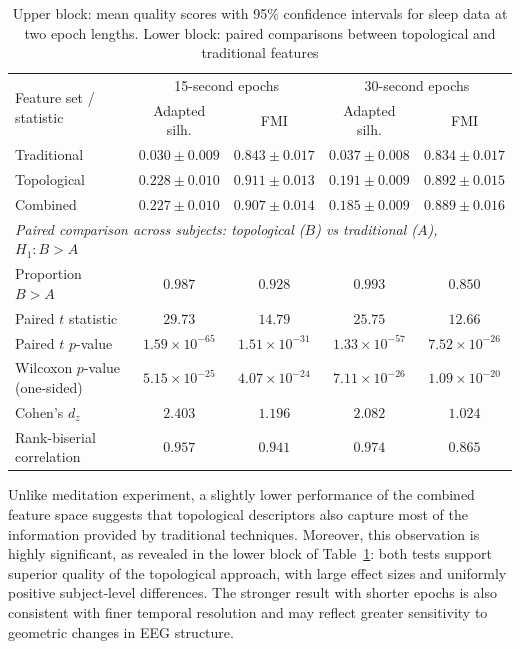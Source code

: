 \documentclass[pdflatex,sn-basic,Numbered]{sn-jnl}
\begin{document}
\begin{table}[t]
\centering
\caption{Upper block: mean quality scores with 95\% confidence intervals for sleep data at two epoch lengths. Lower block: paired comparisons between topological and traditional features}\label{table2}
\begin{tabular}{lcccc}
  \toprule
    \multirow{2}{*}{Feature set / statistic} & \multicolumn{2}{c}{15-second epochs} & \multicolumn{2}{c}{30-second epochs} \\
     & Adapted silh. & FMI & Adapted silh. & FMI \\
  \midrule
    Traditional & $0.030 \pm 0.009$ & $0.843 \pm 0.017$ & $0.037 \pm 0.008$ & $0.834 \pm 0.017$ \\
    Topological & $0.228 \pm 0.010$ & $0.911 \pm 0.013$ & $0.191 \pm 0.009$ & $0.892 \pm 0.015$ \\
    Combined    & $0.227 \pm 0.010$ & $0.907 \pm 0.014$ & $0.185 \pm 0.009$ & $0.889 \pm 0.016$ \\
  \midrule
  \multicolumn{5}{l}{\textit{Paired comparison across subjects: topological ($B$) vs traditional ($A$), $H_1: B > A$}} \\
    Proportion $B > A$               & $0.987$                & $0.928$                & $0.993$ & $0.850$ \\
    Paired $t$ statistic             & $29.73$                & $14.79$                & $25.75$ & $12.66$ \\
    Paired $t$ $p$-value & $1.59 \times 10^{-65}$ & $1.51 \times 10^{-31}$ & $1.33 \times 10^{-57}$ & $7.52 \times 10^{-26}$ \\
    Wilcoxon $p$-value (one-sided) & $5.15 \times 10^{-25}$ & $4.07 \times 10^{-24}$ & $7.11 \times 10^{-26}$ & $1.09 \times 10^{-20}$ \\
    Cohen's $d_z$ & $2.403$ & $1.196$ & $2.082$ & $1.024$ \\
    Rank-biserial correlation & $0.957$ & $0.941$ & $0.974$ & $0.865$ \\
  \bottomrule
\end{tabular}
\end{table}

Unlike meditation experiment, a slightly lower performance of the combined feature space suggests that topological descriptors also capture most of the information provided by traditional techniques. Moreover, this observation is highly significant, as revealed in the lower block of Table~\ref{table2}: both tests support superior quality of the topological approach, with large effect sizes and uniformly positive subject-level differences. The stronger result with shorter epochs is also consistent with finer temporal resolution and may reflect greater sensitivity to geometric changes in EEG structure.
\end{document}
